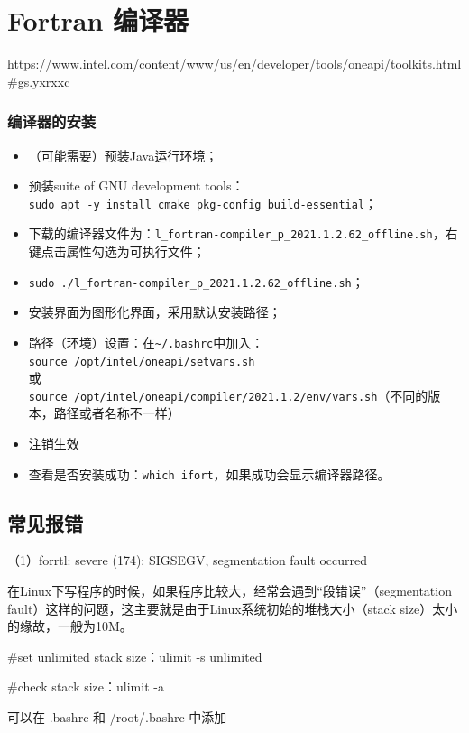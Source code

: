 \newpage
\section{Fortran 编译器}
\url{https://www.intel.com/content/www/us/en/developer/tools/oneapi/toolkits.html#gs.yxrxxc}


\subsubsection{编译器的安装}

\begin{itemize}
\item （可能需要）预装Java运行环境；
\item  预装suite of GNU development tools：\\
\verb*|sudo apt -y install cmake pkg-config build-essential|；
\item 下载的编译器文件为：\verb|l_fortran-compiler_p_2021.1.2.62_offline.sh|，右键点击属性勾选为可执行文件；
\item \verb|sudo ./l_fortran-compiler_p_2021.1.2.62_offline.sh|；
\item 安装界面为图形化界面，采用默认安装路径；
\item 路径（环境）设置：在\verb*|~/.bashrc|中加入：\\
\verb|source /opt/intel/oneapi/setvars.sh|\\
或\\
\verb|source /opt/intel/oneapi/compiler/2021.1.2/env/vars.sh|（不同的版本，路径或者名称不一样）
\item 注销生效
\item 查看是否安装成功：\verb|which ifort|，如果成功会显示编译器路径。
\end{itemize}


\subsection{常见报错}
（1）forrtl: severe (174): SIGSEGV, segmentation fault occurred

在Linux下写程序的时候，如果程序比较大，经常会遇到“段错误”（segmentation fault）这样的问题，这主要就是由于Linux系统初始的堆栈大小（stack size）太小的缘故，一般为10M。

\#set unlimited stack size：ulimit -s unlimited

\#check stack size：ulimit -a

可以在 .bashrc 和 /root/.bashrc 中添加



